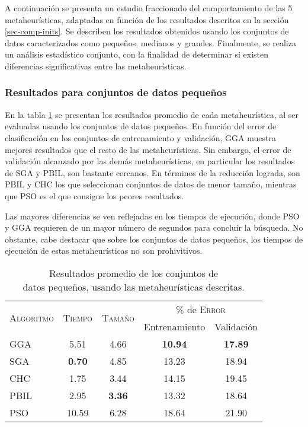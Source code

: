 A continuación se presenta un estudio fraccionado del comportamiento de las 5 metaheurísticas, adaptadas en función de los resultados descritos en la sección \ref{sec-comp-inits}. Se describen los resultados obtenidos usando los conjuntos de datos caracterizados como pequeños, medianos y grandes. Finalmente, se realiza un análisis estadístico conjunto, con la finalidad de determinar si existen diferencias significativas entre las metaheurísticas.

\subsubsection{Resultados para conjuntos de datos pequeños}

En la tabla \ref{res-small} se presentan los resultados promedio de cada metaheurística, al ser evaluadas usando los conjuntos de datos pequeños. En función del error de clasificación en los conjuntos de entrenamiento y validación, GGA muestra mejores resultados que el resto de las metaheurísticas. Sin embargo, el error de validación alcanzado por las demás metaheurísticas, en particular los resultados de SGA y PBIL, son bastante cercanos. En términos de la reducción lograda, son PBIL y CHC los que seleccionan conjuntos de datos de menor tamaño, mientras que PSO es el que consigue los peores resultados.

Las mayores diferencias se ven reflejadas en los tiempos de ejecución, donde PSO y GGA requieren de un mayor número de segundos para concluir la búsqueda. No obstante, cabe destacar que sobre los conjuntos de datos pequeños, los tiempos de ejecución de estas metaheurísticas no son prohivitivos.

\begin{table}[h!]
\centering
\begin{tabular}{l c c c c}
\hline
\multirow{2}{*}{\textsc{Algoritmo}}
	& \multirow{2}{*}{\textsc{Tiempo}}
	& \multirow{2}{*}{\textsc{Tamaño}}
	& \multicolumn{2}{c}{$\%$ de \textsc{Error}} \\\cline{4-5}
 & & & \scriptsize{Entrenamiento} & \scriptsize{Validación} \\
\hline
\hline
GGA  &  5.51 & 4.66 & \textbf{10.94} & \textbf{17.89} \\
SGA  & \textbf{0.70} & 4.85 & 13.23 & 18.94 \\
CHC  &  1.75 & 3.44 & 14.15 & 19.45 \\
PBIL &  2.95 & \textbf{3.36} & 13.32 & 18.64 \\
PSO  & 10.59 & 6.28 & 18.64 & 21.90 \\
\hline
\end{tabular}
\caption[Resultados de metaheurísticas usando conjuntos de datos pequeños]{Resultados promedio de los conjuntos de\\datos pequeños, usando las metaheurísticas descritas.}
\label{res-small}
\end{table}

